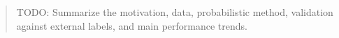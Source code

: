 \begin{abstract}
TODO: Summarize the motivation, data, probabilistic method, validation against external labels, and main performance trends.
\end{abstract}
